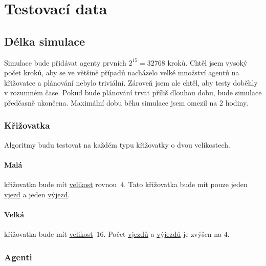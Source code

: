 \section{Testovací data}\label{sec:testovaci_data}


\subsection{Délka simulace}\label{subsec:delka_simulace}

Simulace bude přidávat agenty prvních $2^{15} = 32768$ kroků.
Chtěl jsem vysoký počet kroků, aby se ve většině případů nacházelo
velké množství agentů na křižovatce a plánování nebylo triviální.
Zároveň jsem ale chtěl, aby testy doběhly v rozumném čase.
Pokud bude plánování trvat příliš dlouhou dobu, bude simulace předčasně ukončena.
Maximální dobu běhu simulace jsem omezil na 2 hodiny.

\subsubsection{Křižovatka}

Algoritmy budu testovat na každém typu křižovatky o dvou velikostech.
\paragraph{Malá}\label{par:data_mala} křižovatka bude mít \hyperref[par:velikost_krizovatky]{velikost} rovnou~$4$.
Tato křižovatka bude mít pouze jeden \hyperref[par:vjezdy]{vjezd} a jeden \hyperref[par:vyjezdy]{výjezd}.
\paragraph{Velká}\label{par:data_velka} křižovatka bude mít \hyperref[par:velikost_krizovatky]{velikost}~$16$.
Počet \hyperref[par:vjezdy]{vjezdů} a \hyperref[par:vyjezdy]{výjezdů} je zvýšen na $4$.

\subsubsection{Agenti}

